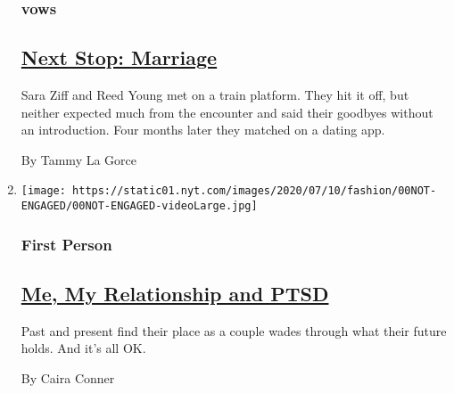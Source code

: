 \begin{enumerate}
  \hypertarget{vows-1}{%
  \subsubsection{vows}\label{vows-1}}

  \hypertarget{next-stop-marriage}{%
  \subsection{\texorpdfstring{\href{/2020/07/24/fashion/weddings/Sara-Ziff-marries-Reed-Young-at-train-station.html}{Next
  Stop: Marriage}}{Next Stop: Marriage}}\label{next-stop-marriage}}

  Sara Ziff and Reed Young met on a train platform. They hit it off, but
  neither expected much from the encounter and said their goodbyes
  without an introduction. Four months later they matched on a dating
  app.

  By Tammy La Gorce
\item
  \texttt{[image: https://static01.nyt.com/images/2020/07/10/fashion/00NOT-ENGAGED/00NOT-ENGAGED-videoLarge.jpg]}

  \hypertarget{first-person}{%
  \subsubsection{First Person}\label{first-person}}

  \hypertarget{me-my-relationship-and-ptsd}{%
  \subsection{\texorpdfstring{\href{/2020/07/25/fashion/weddings/me-my-relationship-and-ptsd.html}{Me,
  My Relationship and
  PTSD}}{Me, My Relationship and PTSD}}\label{me-my-relationship-and-ptsd}}

  Past and present find their place as a couple wades through what their
  future holds. And it's all OK.

  By Caira Conner
\end{enumerate}

